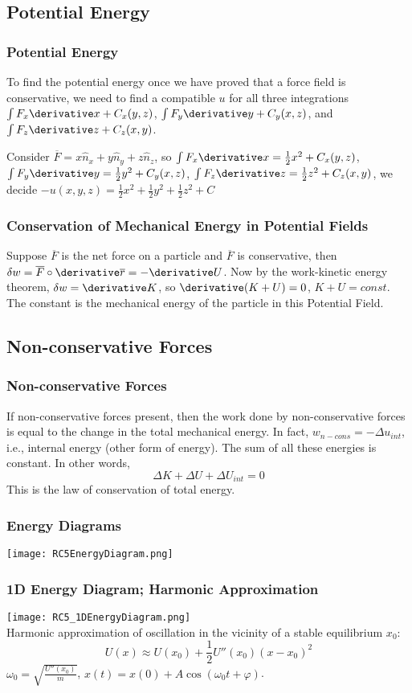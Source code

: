 \subsection{Potential Energy}
\begin{frame}
\frametitle{Potential Energy}
To find the \alert{potential energy} once we have proved that a force field is conservative, we need to find a compatible $u$ for all three integrations $\int F_x\derivative x+C_x(y,z)$, $\int F_y\derivative y+C_y(x,z)$, and $\int F_z\derivative z+C_z(x,y)$.
\begin{example}
Consider $\overline{F}=x\hat{n}_x+y\hat{n}_y+z\hat{n}_z$, so
$\int F_x\derivative x=\frac{1}{2}x^2+C_x(y,z)$, $\int F_y\derivative y=\frac{1}{2}y^2+C_y(x,z)$, $\int F_z\derivative z=\frac{1}{2}z^2+C_z(x,y)$, we decide $-u(x,y,z)=\frac{1}{2}x^2+\frac{1}{2}y^2+\frac{1}{2}z^2+C$
\end{example}
\end{frame}
\begin{frame}
\frametitle{Conservation of Mechanical Energy in Potential Fields}
Suppose $\overline{F}$ is the \alert{net} force on a particle and $\overline{F}$ is \alert{conservative}, then $\delta w=\overline{F}\circ\derivative\overline{r}=-\derivative U$. Now by the work-kinetic energy theorem, $\delta w=\derivative K$, so $\derivative (K+U)=0$, $K+U=const$. The constant is the \alert{mechanical energy} of the particle in this Potential Field.
\end{frame}
\subsection{Non-conservative Forces}
\begin{frame}
\frametitle{Non-conservative Forces}
If \alert{non-conservative forces} present, then the work done by non-conservative forces is equal to the change in the total mechanical energy. In fact, $w_{n-cons}=-\Delta u_{int}$, i.e., internal energy (other form of energy). The sum of all these energies is constant. In other words,
\[\Delta K+\Delta U+\Delta U_{int}=0\]This is the \alert{law of conservation of total energy}.
\end{frame}
\begin{frame}
\frametitle{Energy Diagrams}
\texttt{[image: RC5EnergyDiagram.png]}
\end{frame}
\begin{frame}
\frametitle{1D Energy Diagram; Harmonic Approximation}
\texttt{[image: RC5\_1DEnergyDiagram.png]}\\
\alert{Harmonic} approximation of oscillation in the \alert{vicinity} of a \alert{stable equilibrium} $x_0$:\[U(x)\approx U(x_0)+\frac{1}{2}U''(x_0)(x-x_0)^2\]
$\omega_0=\sqrt{\frac{U''(x_0)}{m}}$, $x(t)=x(0)+A\cos(\omega_0 t+\varphi)$.
\end{frame}
